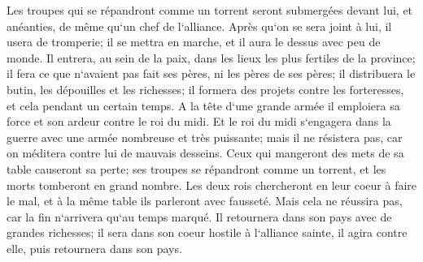 \verse Les troupes qui se répandront comme un torrent seront submergées devant lui, et anéanties, de même qu`un chef de l`alliance. 
\verse Après qu`on se sera joint à lui, il usera de tromperie; il se mettra en marche, et il aura le dessus avec peu de monde. 
\verse Il entrera, au sein de la paix, dans les lieux les plus fertiles de la province; il fera ce que n`avaient pas fait ses pères, ni les pères de ses pères; il distribuera le butin, les dépouilles et les richesses; il formera des projets contre les forteresses, et cela pendant un certain temps. 
\verse A la tête d`une grande armée il emploiera sa force et son ardeur contre le roi du midi. Et le roi du midi s`engagera dans la guerre avec une armée nombreuse et très puissante; mais il ne résistera pas, car on méditera contre lui de mauvais desseins. 
\verse Ceux qui mangeront des mets de sa table causeront sa perte; ses troupes se répandront comme un torrent, et les morts tomberont en grand nombre. 
\verse Les deux rois chercheront en leur coeur à faire le mal, et à la même table ils parleront avec fausseté. Mais cela ne réussira pas, car la fin n`arrivera qu`au temps marqué. 
\verse Il retournera dans son pays avec de grandes richesses; il sera dans son coeur hostile à l`alliance sainte, il agira contre elle, puis retournera dans son pays. 

